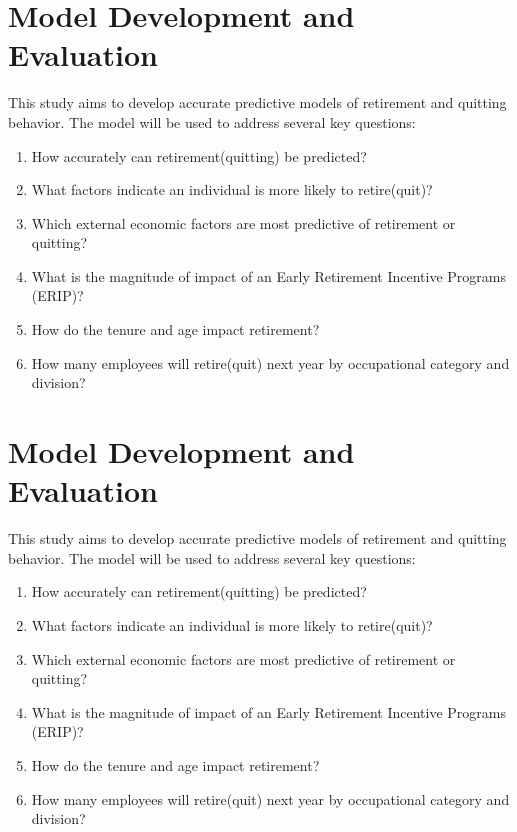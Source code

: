 \documentclass[12pt,letterpaper]{article}
\begin{document}
\section{Model Development and Evaluation}
This study aims to develop accurate predictive models of retirement and quitting behavior. The model will be used to address several key questions:
\begin{enumerate}
	\item How accurately can retirement(quitting) be predicted?
	\item What factors indicate an individual is more likely to retire(quit)?
	\item Which external economic factors are most predictive of retirement or quitting?
	\item What is the magnitude  of impact of an Early Retirement Incentive Programs (ERIP)?
	\item How do the tenure and age impact retirement?
	\item How many employees will retire(quit) next year by occupational category and division?
\end{enumerate}

\section{Model Development and Evaluation}
This study aims to develop accurate predictive models of retirement and quitting behavior. The model will be used to address several key questions:
\begin{enumerate}
\item How accurately can retirement(quitting) be predicted?
\item What factors indicate an individual is more likely to retire(quit)?
\item Which external economic factors are most predictive of retirement or quitting?
\item What is the magnitude  of impact of an Early Retirement Incentive Programs (ERIP)?
\item How do the tenure and age impact retirement?
\item How many employees will retire(quit) next year by occupational category and division?
\end{enumerate}
\end{document}
